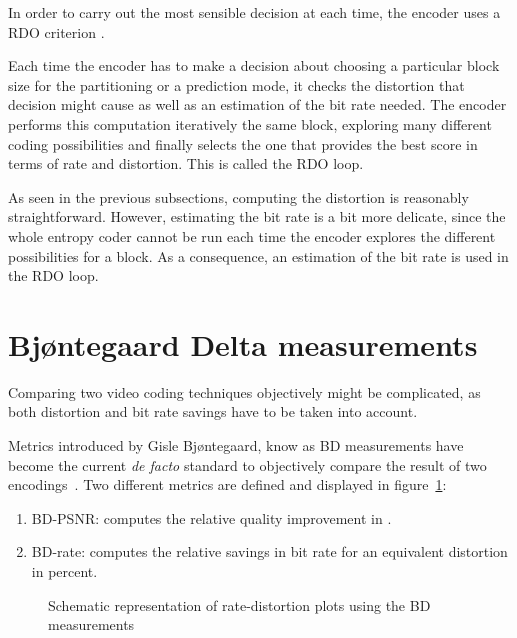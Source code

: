 \documentclass[11pt,a4paper,openright,twoside]{book}
\numberwithin{equation}{section} %
\numberwithin{figure}{section} %
\numberwithin{table}{section} %
\begin{document}
In order to carry out the most sensible decision at each time, the
encoder uses a \ac{RDO} criterion
\cite{sullivan-98-rdo-video-compression}.

Each time the encoder has to make a decision about choosing a
particular block size for the partitioning or a prediction mode, it
checks the distortion that decision might cause as well as an estimation
of the bit rate needed.
The encoder performs this computation iteratively the same block,
exploring many different coding possibilities and finally selects the
one that provides the best score in terms of rate and distortion.
This is called the \ac{RDO} loop.

As seen in the previous subsections, computing the distortion is
reasonably straightforward.
However, estimating the bit rate is a bit more delicate, since the whole
entropy coder cannot be run each time the encoder explores the different
possibilities for a block.
As a consequence, an estimation of the bit rate is used in the \ac{RDO}
loop.

\section{Bj{\o}ntegaard Delta measurements}
\label{sub:bjontegaard_delta_measurements}

Comparing two video coding techniques objectively might be complicated,
as both distortion and bit rate savings have to be taken into account.

Metrics introduced by Gisle Bj{\o}ntegaard, know as \ac{BD} measurements
have become the current \emph{de facto} standard to objectively compare
the result of two encodings~\cite{VCEG-M33,VCEG-AI11}.
Two different metrics are defined and displayed in
figure~\ref{fig:bdsnr_bdrate}:
\begin{enumerate}[label = (\alph{enumi})]
	\item \ac{BD}-\ac{PSNR}: computes the relative quality improvement
		in \deci\bel.
	\item \ac{BD}-rate: computes the relative savings in bit rate for an
		equivalent distortion in percent.
\end{enumerate}

\begin{figure}[tb]
	\centering
	\hfill
	\caption{Schematic representation of rate-distortion plots using the
	\ac{BD} measurements}
	\label{fig:bdsnr_bdrate}
\end{figure}
\end{document}
